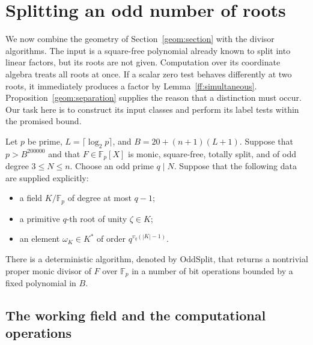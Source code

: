\section{Splitting an odd number of roots}
\label{odd:section}

We now combine the geometry of Section~\ref{geom:section} with the divisor
algorithms.  The input is a square-free polynomial already known to split
into linear factors, but its roots are not given.  Computation over its
coordinate algebra treats all roots at once.  If a scalar zero test behaves
differently at two roots, it immediately produces a factor by
Lemma~\ref{ff:simultaneous}.  Proposition~\ref{geom:separation} supplies
the reason that a distinction must occur.  Our task here is to construct
its input classes and perform its label tests within the promised bound.

\begin{samepage}
\begin{proposition}
\label{odd:split}
Let $p$ be prime, $L=\lceil\log_2p\rceil$, and
$B=20+(n+1)(L+1)$.  Suppose that $p>B^{200000}$ and that
$F\in\mathbb F_p[X]$ is monic, square-free, totally split, and of odd
degree $3\le N\le n$.  Choose an odd prime $q\mid N$.
Suppose that the following data are supplied explicitly:
\begin{itemize}
\item a field $K/\mathbb F_p$ of degree at most $q-1$;
\item a primitive $q$-th root of unity $\zeta\in K$;
\item an element $\omega_K\in K^*$ of order
      $q^{v_q(|K|-1)}$.
\end{itemize}
There is a deterministic algorithm, denoted by $\mathrm{OddSplit}$, that
returns a nontrivial proper monic divisor of $F$ over $\mathbb F_p$ in a
number of bit operations bounded by a fixed polynomial in $B$.
\end{proposition}
\end{samepage}

\subsection{The working field and the computational operations}


